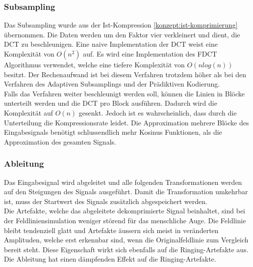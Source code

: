 \subsubsection{Subsampling} \label{konzept:loesung1:subsampling}
Das Subsampling wurde aus der Ist-Kompression \ref{konzept:ist-komprimierung} übernommen. Die Daten werden um den Faktor vier verkleinert und dient, die DCT zu beschleunigen. Eine naive Implementation der DCT weist eine Komplexität von $O(n^2)$ auf. Es wird eine Implementation des FDCT Algorithmus verwendet, welche eine tiefere Komplexität von $O(n log(n))$ besitzt. Der Rechenaufwand ist bei diesem Verfahren trotzdem höher als bei den Verfahren des Adaptiven Subsamplings und der Prädiktiven Kodierung.\\
Falls das Verfahren weiter beschleunigt werden soll, können die Linien in Blöcke unterteilt werden und die DCT pro Block ausführen. Dadurch wird die Komplexität auf $O(n)$ gesenkt. Jedoch ist es wahrscheinlich, dass durch die Unterteilung die Kompressionsrate leidet. Die Approximation mehrere Blöcke des Eingabesignals benötigt schlussendlich mehr Kosinus Funktionen, als die Approximation des gesamten Signals.

\subsubsection{Ableitung}
Das Eingabesignal wird abgeleitet und alle folgenden Transformationen werden auf den Steigungen des Signals ausgeführt. Damit die Transformation umkehrbar ist, muss der Startwert des Signals zusätzlich abgespeichert werden.\\
Die Artefakte, welche das abgeleitete dekomprimierte Signal beinhaltet, sind bei der Feldliniensimulation weniger störend für das menschliche Auge. Die Feldlinie bleibt tendenziell glatt und Artefakte äussern sich meist in veränderten Amplituden, welche erst erkennbar sind, wenn die Originalfeldlinie zum Vergleich bereit steht. Diese Eigenschaft wirkt sich ebenfalls auf die Ringing-Artefakte aus. Die Ableitung hat einen dämpfenden Effekt auf die Ringing-Artefakte.

